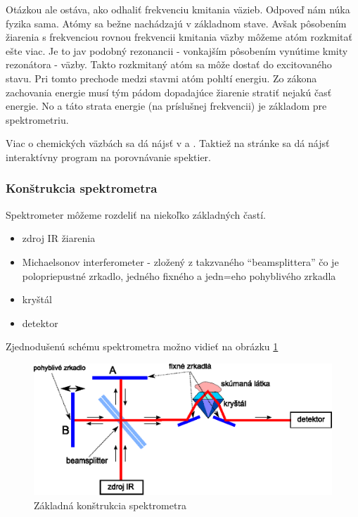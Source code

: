 Otázkou ale ostáva, ako odhaliť frekvenciu kmitania väzieb. Odpoveď
nám núka fyzika sama. Atómy sa bežne nachádzajú v základnom stave.
Avšak pôsobením žiarenia s frekvenciou rovnou frekvencii kmitania
väzby môžeme atóm rozkmitať ešte viac. Je to jav podobný rezonancii - 
vonkajším pôsobením vynútime kmity rezonátora - väzby.
Takto rozkmitaný atóm sa môže dostať do excitovaného stavu. Pri tomto
prechode medzi stavmi atóm pohltí energiu. Zo zákona zachovania
energie musí tým pádom dopadajúce žiarenie stratiť nejakú časť
energie. No a táto strata energie (na príslušnej frekvencii) je
základom pre spektrometriu.


\begin{poznamka}
Viac o chemických väzbách sa dá nájsť v \cite{wiki:bonds} a
\cite{Chem}. Taktiež na stránke \cite{webspectra} sa dá nájsť
interaktívny program na porovnávanie spektier.
\end{poznamka}

\subsubsection{Konštrukcia spektrometra}
Spektrometer môžeme rozdeliť na niekoľko základných častí.
\begin{itemize}
\item zdroj IR žiarenia 
\item Michaelsonov interferometer - zložený z takzvaného
``beamsplittera'' čo je polopriepustné zrkadlo, jedného fixného
a jedn=eho pohyblivého zrkadla
\item kryštál
\item detektor
\end{itemize}
Zjednodušenú schému spektrometra možno vidieť na obrázku
\ref{fig:ftir_schema}

\begin{figure}[htp]
\centering
\includegraphics{obrazky/ftir_schema}
\caption{Základná konštrukcia spektrometra}\label{fig:ftir_schema}
\end{figure}

